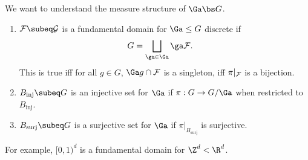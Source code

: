 We want to understand the measure structure of $\Ga\bs G$. 
\begin{df}
\begin{enumerate}
\item
$\cal F\subeq G$ is a fundamental domain for $\Ga\le G$ discrete if 
\begin{align}
G&=\bigsqcup_{\ga\in \Ga} \ga \cal F.
\end{align}
This is true iff  for all $g\in G$, $\Ga g\cap \cal F$ is a singleton, iff $\pi|_{\cal F}$ is a bijection.
\item
$B_{\text{inj}}\subeq G$ is an injective set for $\Ga$ if $\pi:G\to G/\Ga$ when restricted to $B_{\text{inj}}$. 
\item
$B_{\text{surj}}\subeq G$ is a surjective set for $\Ga$ if $\pi|_{B_{\text{surj}}}$ is surjective.
\end{enumerate}
\end{df}
For example, $[0,1)^d$ is a fundamental domain for $\Z^d<\R^d$. 

